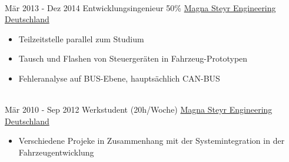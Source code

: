 \documentclass[a4paper]{twentysecondcv} %
\begin{document}
\begin{twenty}
{        }
    \\   
    \twentyitem
   		{Mär 2013 -}
		{Dez 2014}
        {Entwicklungsingenieur 50\%}
        {\href{https://www.magna.com/de}{Magna Steyr Engineering Deutschland}}
        {}
        {
        {\begin{itemize}
        \item Teilzeitstelle parallel zum Studium
        \item Tausch und Flashen von Steuergeräten in Fahrzeug-Prototypen
        \item Fehleranalyse auf BUS-Ebene, hauptsächlich CAN-BUS
    \end{itemize}}
        }
     \\
     \twentyitem
   		{Mär 2010 -}
		{Sep 2012}
        {Werkstudent (20h/Woche)}
        {\href{https://www.magna.com/de}{Magna Steyr Engineering Deutschland}}
        {}
        {
        \begin{itemize}
        \item Verschiedene Projeke in Zusammenhang mit der Systemintegration in der Fahrzeugentwicklung
    \end{itemize}
    	}
        
\end{twenty}

\end{document}
